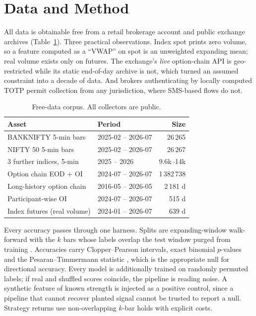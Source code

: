 \documentclass[conference]{IEEEtran}
\begin{document}
%


\section{Data and Method}

All data is obtainable free from a retail brokerage account and public exchange
archives (Table~\ref{tab:data}). Three practical observations. Index spot prints
zero volume, so a feature computed as a ``VWAP'' on spot is an unweighted
expanding mean; real volume exists only on futures. The exchange's \emph{live}
option-chain API is geo-restricted while its static end-of-day archive is not,
which turned an assumed constraint into a decade of data. And brokers
authenticating by locally computed TOTP permit collection from any jurisdiction,
where SMS-based flows do not.

\begin{table}[t]
\caption{Free-data corpus. All collectors are public.}
\label{tab:data}
\small
\footnotesize
\begin{tabular}{@{}llr@{}}
\toprule
\textbf{Asset} & \textbf{Period} & \textbf{Size} \\
\midrule
BANKNIFTY 5-min bars & 2025-02 -- 2026-07 & 26\,265 \\
NIFTY 50 5-min bars & 2025-02 -- 2026-07 & 26\,267 \\
3 further indices, 5-min & 2025 -- 2026 & 9.6k--14k \\
Option chain EOD + OI & 2024-07 -- 2026-07 & 1\,382\,738 \\
Long-history option chain & 2016-05 -- 2026-05 & 2\,181 d \\
Participant-wise OI & 2024-07 -- 2026-07 & 515 d \\
Index futures (real volume) & 2024-01 -- 2026-07 & 639 d \\
\bottomrule
\end{tabular}
\end{table}

Every accuracy passes through one harness. Splits are expanding-window
walk-forward with the $k$ bars whose labels overlap the test window purged from
training \cite{prado2018}. Accuracies carry Clopper--Pearson \cite{clopper1934}
intervals, exact binomial $p$-values and the Pesaran--Timmermann statistic
\cite{pt1992}, which is the appropriate null for directional accuracy. Every
model is additionally trained on randomly permuted labels; if real and shuffled
scores coincide, the pipeline is reading noise. A synthetic feature of known
strength is injected as a positive control, since a pipeline that cannot recover
planted signal cannot be trusted to report a null. Strategy returns use
non-overlapping $k$-bar holds with explicit costs.
\end{document}
